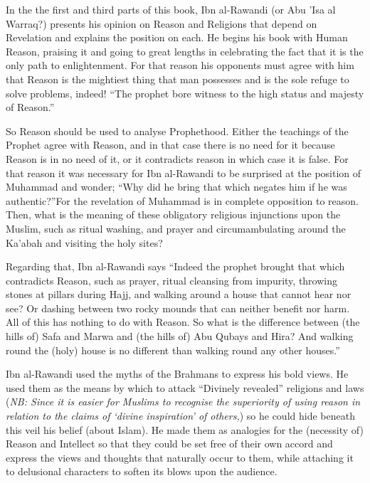 \documentclass[12pt]{book}
\newcommand{\NB}[1]{\emph{\small NB: #1}}
\begin{document}

In the the first and third parts of this book, Ibn al-Rawandi (or Abu ’Isa al
Warraq?) presents his opinion on Reason and Religions that depend on Revelation
and explains the position on each. He begins his book with Human Reason,
praising it and going to great lengths in celebrating the fact that it is the
only path to enlightenment. For that reason his opponents must agree with him
that Reason is the mightiest thing that man possesses and is the sole refuge to
solve problems, indeed! “The prophet bore witness to the high status and
majesty of Reason.”\footnotemark


So Reason should be used to analyse Prophethood. Either the teachings of the
Prophet agree with Reason, and in that case there is no need for it because
Reason is in no need of it, or it contradicts reason in which case it is false.
For that reason it was necessary for Ibn al-Rawandi to be surprised at the
position of Muhammad and wonder; “Why did he bring that which negates him if he
was authentic?”\footnotemark For the revelation of Muhammad is in complete
opposition to reason. Then, what is the meaning of these obligatory religious
injunctions upon the Muslim, such as ritual washing, and prayer and
circumambulating around the Ka’abah and visiting the holy sites?


Regarding that, Ibn al-Rawandi says “Indeed the prophet brought that which
contradicts Reason, such as prayer, ritual cleansing from impurity, throwing
stones at pillars during Hajj, and walking around a house that cannot hear nor
see? Or dashing between two rocky mounds that can neither benefit nor harm. All
of this has nothing to do with Reason. So what is the difference between (the
hills of) Safa and Marwa and (the hills of) Abu Qubays and Hira? And walking
round the (holy) house is no different than walking round any other
houses.”\footnotemark


Ibn al-Rawandi used the myths of the Brahmans to express his bold views.
He used them as the means by which to attack
“Divinely revealed” religions and laws
(\NB{Since it is easier for Muslims to recognise the superiority of using
reason in relation to the claims of ‘divine inspiration’ of others,})
so he could hide beneath this veil his belief (about Islam).
He made them as
analogies for the (necessity of) Reason and Intellect so that they could be set
free of their own accord and express the views and thoughts that naturally
occur to them, while attaching it to delusional characters to soften its blows
upon the audience.
\end{document}
